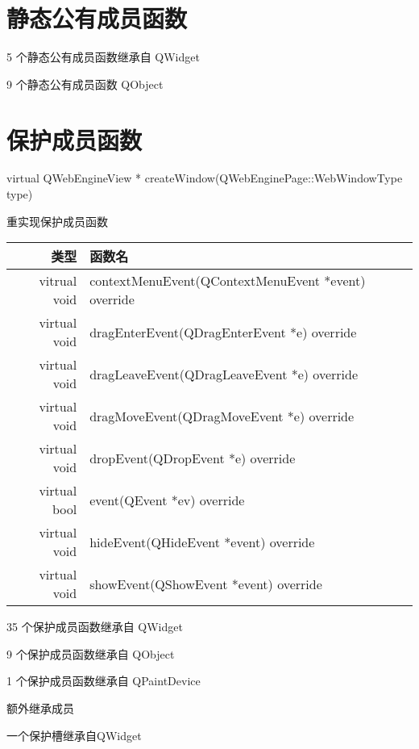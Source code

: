 \section{静态公有成员函数}

\begin{compactitem}
	\item 5 个静态公有成员函数继承自 QWidget
	\item 9 个静态公有成员函数 QObject
\end{compactitem}

\section{保护成员函数}


virtual QWebEngineView * createWindow(QWebEnginePage::WebWindowType type)

重实现保护成员函数

\begin{tabular}{|r|l|}
	\hline
	类型&  函数名\\
	\hline
vitrual void&	contextMenuEvent(QContextMenuEvent *event) override\\
	\hline
virtual void&	dragEnterEvent(QDragEnterEvent *e) override\\
	\hline
virtual void&	dragLeaveEvent(QDragLeaveEvent *e) override\\
	\hline
virtual void&	dragMoveEvent(QDragMoveEvent *e) override\\
	\hline
virtual void&	dropEvent(QDropEvent *e) override\\
	\hline
virtual bool&	event(QEvent *ev) override\\
	\hline
virtual void&	hideEvent(QHideEvent *event) override\\
	\hline
virtual void&	showEvent(QShowEvent *event) override \\
	\hline
\end{tabular}

\begin{compactitem}
\item 35 个保护成员函数继承自 QWidget	
\item 9 个保护成员函数继承自 QObject	
\item 1 个保护成员函数继承自 QPaintDevice
\end{compactitem}

额外继承成员

\begin{compactitem}
	\item 一个保护槽继承自QWidget
\end{compactitem}

